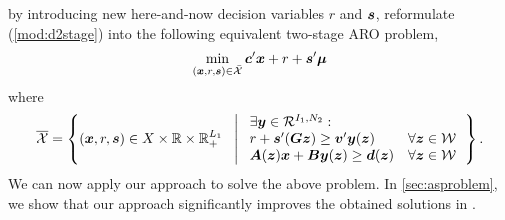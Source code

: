 \documentclass[fleqn,isre,blindrev]{informs4}
\newcommand{\mb}[1]{\mbox{\boldmath \ensuremath{#1}}}
\begin{document}
		by introducing new here-and-now decision variables $r$ and $\mb{s}$, \cite{bsz17} reformulate (\ref{mod:d2stage}) into the following equivalent two-stage ARO problem,
\begin{equation*}
		\min_{(\boldsymbol{x}, r, \boldsymbol{s})  \in \bar{\mathcal{X}}}  \mb{c}'\mb{x} +  r+\mb{s}{'}\mb{\mu}
\end{equation*}
		where
\begin{equation*}
			\overline{\mathcal{X}} = \left\{ (\mb{x},r,\mb{s}) \in X \times \mathbb{R} \times  \mathbb{R}^{L_1}_+ \ \hspace{3pt} \left|  
			\hspace{3pt} 
			\begin{array}{ll}
				\exists \mb{y} \in \mathcal{R}^{I_1,N_2}: \\
				r+\mb{s}{'}(\mb{G}\mb{z}) \geq \mb{v}'\mb{y}(\mb{z}) &  \forall \mb{z} \in \mathcal{W} \\
				\mb{A}(\mb{z})\mb{x}+\mb{B}\mb{y}(\mb{z}) \geq\mb{d}(\mb{z}) &   \forall \mb{z} \in \mathcal{W} 
			\end{array} \right.
			\right\}.
\end{equation*}
		We can now apply our approach to solve the above problem.  In \textsection \ref{sec:asproblem},  we show that our approach significantly improves the obtained solutions in \cite{bsz17}.
		
\end{document}
